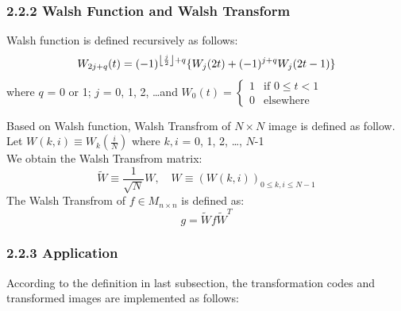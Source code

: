 \documentclass[12pt]{article}
\DeclarePairedDelimiter\floor{\lfloor}{\rfloor}
\begin{document}
\subsubsection*{2.2.2 \quad Walsh Function and Walsh Transform}
Walsh function is defined recursively as follows: 
\begin{equation*}
    W_{2j+q}(t) = (-1)^{\floor*{\frac{j}{2}}+q} \{W_j(2t)+(-1)^{j+q}W_j(2t-1)\}
\end{equation*} 
where $q$ = 0 or 1; $j$ = 0, 1, 2, \dots and $W_0(t) = \begin{cases}
        1 & \text{if $0 \leq t < 1$}\\
        0 & \text{elsewhere}
    \end{cases}$\\
\begin{flushleft}
Based on Walsh function, Walsh Transfrom of $N\times N$ image is defined as follow.\\
Let $W(k,i) \equiv W_{k}\left(\frac{i}{N}\right)$ where $k,i$ = 0, 1, 2, \ldots, $N$-1 \\
We obtain the Walsh Transfrom matrix:
\begin{equation*}
 \tilde{W} \equiv\frac{1}{\sqrt{N}}W, \quad W \equiv(W (k,i))_{0\leqslant k,i \leqslant N-1}
\end{equation*}
The Walsh Transfrom of $f \in M_{n\times n}$ is defined as:
\begin{equation*}
    g = \tilde{W}f\tilde{W}^T
\end{equation*}
\end{flushleft} 

\subsubsection*{2.2.3 \quad Application}
According to the definition in last subsection, the transformation codes and transformed images are implemented as follows:
\end{document}
